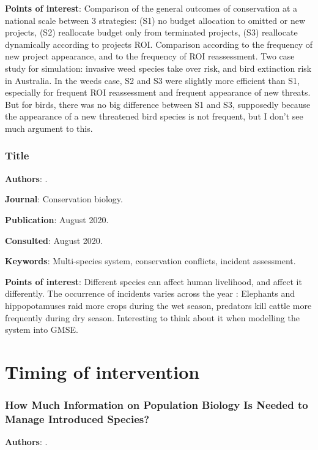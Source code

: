 \documentclass[12pt,a4paper]{article}
\begin{document}
\textbf{Points of interest}: Comparison of the general outcomes of conservation at a national scale between 3 strategies: (S1) no budget allocation to omitted or new projects, (S2) reallocate budget only from terminated projects, (S3) reallocate dynamically according to projects ROI. Comparison according to the frequency of new project appearance, and to the frequency of ROI reassessment. Two case study for simulation: invasive weed species take over risk, and bird extinction risk in Australia. In the weeds case, S2 and S3 were slightly more efficient than S1, especially for frequent ROI reassessment and frequent appearance of new threats. But for birds, there was no big difference between S1 and S3, supposedly because the appearance of a new threatened bird species is not frequent, but I don't see much argument to this.

\newpage

\subsubsection*{Title}

\textbf{Authors}: \cite{pozo2020multispecies}.

\textbf{Journal}: Conservation biology.

\textbf{Publication}: August 2020.

\textbf{Consulted}: August 2020.

\textbf{Keywords}: Multi-species system, conservation conflicts, incident assessment.

\textbf{Points of interest}: Different species can affect human livelihood, and affect it differently. The occurrence of incidents varies across the year : Elephants and hippopotamuses raid more crops during the wet season, predators kill cattle more frequently during dry season. Interesting to think about it when modelling the system into GMSE.

\newpage

\section*{Timing of intervention}

\subsubsection*{How Much Information on Population Biology Is Needed to Manage Introduced Species?}

\textbf{Authors}: \cite{simberloff2003information}.
\end{document}
